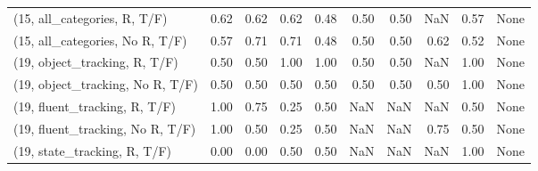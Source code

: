 \begin{table*}[h!]
\begin{adjustbox}{width=2\columnwidth,center}
\begin{tabular}{lrrr|rrr|rrr}
(15, all\_categories, R, T/F)          &                      0.62 &                  0.62 &                      0.62 &                          0.48 &                      0.50 &                          0.50 &                                    NaN &                               0.57 &                                  None \\
(15, all\_categories, No R, T/F)       &                      0.57 &                  0.71 &                      0.71 &                          0.48 &                      0.50 &                          0.50 &                                   0.62 &                               0.52 &                                  None \\



\midrule
(19, object\_tracking, R, T/F)         &                      0.50 &                  0.50 &                      1.00 &                          1.00 &                      0.50 &                          0.50 &                                    NaN &                               1.00 &                                  None \\
(19, object\_tracking, No R, T/F)      &                      0.50 &                  0.50 &                      0.50 &                          0.50 &                      0.50 &                          0.50 &                                   0.50 &                               1.00 &                                  None \\
(19, fluent\_tracking, R, T/F)         &                      1.00 &                  0.75 &                      0.25 &                          0.50 &                       NaN &                           NaN &                                    NaN &                               0.50 &                                  None \\
(19, fluent\_tracking, No R, T/F)      &                      1.00 &                  0.50 &                      0.25 &                          0.50 &                       NaN &                           NaN &                                   0.75 &                               0.50 &                                  None \\
(19, state\_tracking, R, T/F)          &                      0.00 &                  0.00 &                      0.50 &                          0.50 &                       NaN &                           NaN &                                    NaN &                               1.00 &                                  None \\

\end{tabular}
\end{adjustbox}
\end{table*}
